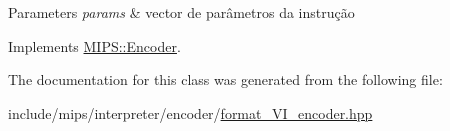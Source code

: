 \begin{DoxyParams}{Parameters}
{\em params} & vector de parâmetros da instrução \\
\hline
\end{DoxyParams}


Implements \hyperlink{classMIPS_1_1Encoder_a4a29c42d601460be8e8d353d8fc0da34}{M\+I\+P\+S\+::\+Encoder}.



The documentation for this class was generated from the following file\+:\begin{DoxyCompactItemize}
\item 
include/mips/interpreter/encoder/\hyperlink{format__VI__encoder_8hpp}{format\+\_\+\+V\+I\+\_\+encoder.\+hpp}\end{DoxyCompactItemize}
